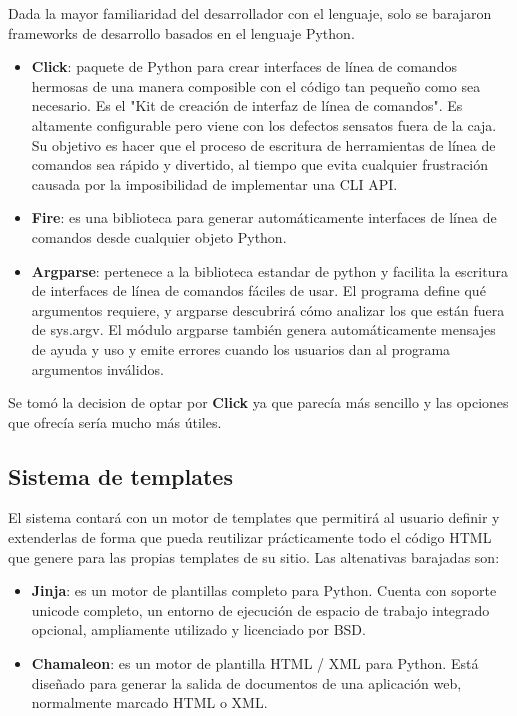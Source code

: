 Dada la mayor familiaridad del desarrollador con el lenguaje, solo se barajaron
frameworks de desarrollo basados en el lenguaje Python.

\begin{itemize}
\item \textbf{Click}: paquete de Python para crear interfaces de línea de comandos hermosas de
una manera composible con el código tan pequeño como sea necesario. Es el "Kit de creación de interfaz de
línea de comandos". Es altamente configurable pero viene con los defectos sensatos fuera de la caja. Su objetivo es
hacer que el proceso de escritura de herramientas de línea de comandos sea rápido y divertido, al tiempo
que evita cualquier frustración causada por la imposibilidad de implementar una CLI API.
\item \textbf{Fire}: es una biblioteca para generar automáticamente interfaces de línea de comandos
desde cualquier objeto Python.
\item \textbf{Argparse}: pertenece a la biblioteca estandar de python y facilita la escritura de interfaces
de línea de comandos fáciles de usar. El programa define qué argumentos requiere, y argparse descubrirá cómo
analizar los que están fuera de sys.argv. El módulo argparse también genera automáticamente mensajes de ayuda
y uso y emite errores cuando los usuarios dan al programa argumentos inválidos.
\end{itemize}

Se tomó la decision de optar por \textbf{Click} ya que parecía más sencillo y las opciones que ofrecía sería mucho
más útiles.

\subsection{Sistema de templates}

El sistema contará con un motor de templates que permitirá al usuario definir y extenderlas de forma que pueda reutilizar
prácticamente todo el código HTML que genere para las propias templates de su sitio. Las altenativas barajadas son:


\begin{itemize}
\item \textbf{Jinja}: es un motor de plantillas completo para Python. Cuenta con soporte unicode completo,
un entorno de ejecución de espacio de trabajo integrado opcional, ampliamente utilizado y licenciado por BSD.
\item \textbf{Chamaleon}: es un motor de plantilla HTML / XML para Python. Está diseñado para generar
la salida de documentos de una aplicación web, normalmente marcado HTML o XML.
\end{itemize}

